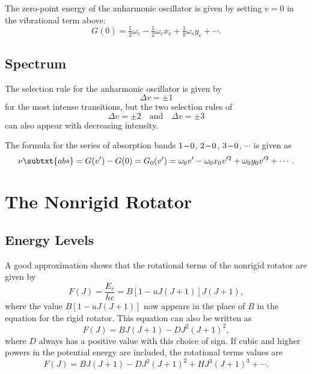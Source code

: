 The zero-point energy of the anharmonic oscillator is given by setting $v = 0$ in the vibrational term above:
\begin{equation*}
    G(0) = \tfrac{1}{2}\omega_{e} - \tfrac{1}{2}\omega_{e}x_{e} + \tfrac{1}{8}\omega_{e}y_{e} + \dotsb.
\end{equation*}

\subsection{Spectrum}

The selection rule for the anharmonic oscillator is given by
\begin{equation*}
    \Delta{}v = \pm 1
\end{equation*}
for the most intense transitions, but the two selection rules of
\begin{equation*}
    \Delta{}v = \pm 2 \quad\text{and}\quad \Delta{}v = \pm 3
\end{equation*}
can also appear with decreasing intensity.

The formula for the series of absorption bands $1\!-\!0$, $2\!-\!0$, $3\!-\!0$, $\dotsb$ is given as
\begin{equation*}
    \nu\subtxt{abs} = G(v') - G(0) = G_{0}(v') = \omega_{0}v' - \omega_{0}x_{0}v'^{2} + \omega_{0}y_{0}v'^{3} + \dotsb.
\end{equation*}

\section{The Nonrigid Rotator}
\label{s:the_nonrigid_rotator}

\subsection{Energy Levels}

A good approximation shows that the rotational terms of the nonrigid rotator are given by
\begin{equation*}
    F(J) = \frac{E_{r}}{hc} = B[1 - uJ(J + 1)]J(J + 1),
\end{equation*}
where the value $B[1 - uJ(J + 1)]$ now appears in the place of $B$ in the equation for the rigid rotator. This equation can also be written as
\begin{equation*}
    F(J) = BJ(J + 1) - DJ^{2}(J + 1)^{2},
\end{equation*}
where $D$ always has a positive value with this choice of sign. If cubic and higher powers in the potential energy are included, the rotational terms values are
\begin{equation*}
    F(J) = BJ(J + 1) - DJ^{2}(J + 1)^{2} + HJ^{3}(J + 1)^{3} + \dotsb.
\end{equation*}

